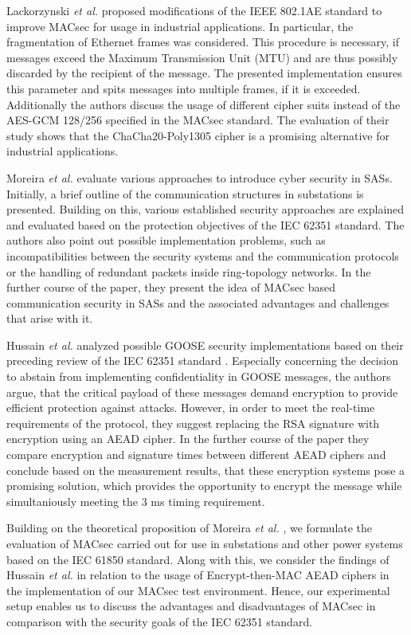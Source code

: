 \documentclass[conference]{IEEEtran}
\begin{document}
\smallskip
Lackorzynski \textit{et al.} \cite{MACsecIndustrialOptimization:2020} proposed modifications of the IEEE 802.1AE standard to improve MACsec for usage 
in industrial applications. In particular, the fragmentation of Ethernet frames was considered. This procedure is necessary, if messages exceed the 
Maximum Transmission Unit (MTU) and are thus possibly discarded by the recipient of the message. The presented implementation ensures this parameter 
and spits messages into multiple frames, if it is exceeded. Additionally the authors discuss the usage of different cipher suits instead of the 
AES-GCM 128/256 specified in the MACsec standard. The evaluation of their study shows that the ChaCha20-Poly1305 cipher is a promising alternative 
for industrial applications.

\smallskip
Moreira \textit{et al.} \cite{Cybersecurity_Substation:2016} evaluate various approaches to introduce cyber security in SASs. Initially, a brief outline 
of the communication structures in substations is presented. Building on this, various established security approaches are explained and evaluated based 
on the protection objectives of the IEC 62351 standard. The authors also point out possible implementation problems, such as incompatibilities between 
the security systems and the communication protocols or the handling of redundant packets inside ring-topology networks. In the further course of the 
paper, they present the idea of MACsec based communication security in SASs and the associated advantages and challenges that arise with it. 

\smallskip
Hussain \textit{et al.} \cite{GOOSE_confidentiality_integrity:2020} analyzed possible GOOSE security implementations based on their preceding review 
of the IEC 62351 standard \cite{Review_IEC62351:2019}. Especially concerning the decision to abstain from implementing confidentiality in GOOSE messages, 
the authors argue, that the critical payload of these messages demand encryption to provide efficient protection against attacks. However, in order to 
meet the real-time requirements of the protocol, they suggest replacing the RSA signature with encryption using an AEAD cipher. In the further course 
of the paper they compare encryption and signature times between different AEAD ciphers and conclude based on the measurement results, that these encryption 
systems pose a promising solution, which provides the opportunity to encrypt the message while simultaniously  meeting the 3 ms timing requirement.

\smallskip 
Building on the theoretical proposition of Moreira \textit{et al.} \cite{Cybersecurity_Substation:2016}, we formulate the evaluation of MACsec carried out 
for use in substations and other power systems based on the IEC 61850 standard. Along with this, we consider the findings of Hussain \textit{et al.} 
\cite{GOOSE_confidentiality_integrity:2020} in relation to the usage of Encrypt-then-MAC AEAD ciphers in the implementation of our MACsec test environment. 
Hence, our experimental setup enables us to discuss the advantages and disadvantages of MACsec in comparison with the security goals of the IEC 62351 standard. 
\end{document}
